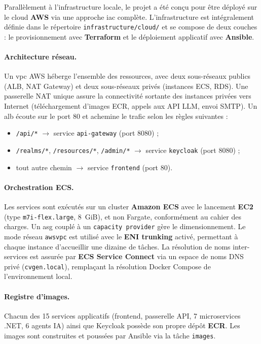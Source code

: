 Parallèlement à l'infrastructure locale, le projet \projectname{} a été conçu pour être déployé sur le cloud \textbf{AWS} via une approche \gls{iac} complète. L'infrastructure est intégralement définie dans le répertoire \texttt{infrastructure/cloud/} et se compose de deux couches : le provisionnement avec \textbf{Terraform} et le déploiement applicatif avec \textbf{Ansible}.

\paragraph{Architecture réseau.} Un \gls{vpc} AWS héberge l'ensemble des ressources, avec deux sous-réseaux publics (ALB, NAT Gateway) et deux sous-réseaux privés (instances ECS, RDS). Une passerelle NAT unique assure la connectivité sortante des instances privées vers Internet (téléchargement d'images ECR, appels aux API LLM, envoi SMTP). Un \gls{alb} écoute sur le port 80 et achemine le trafic selon les règles suivantes :
\begin{itemize}
    \item \texttt{/api/*} $\rightarrow$ service \texttt{api-gateway} (port 8080) ;
    \item \texttt{/realms/*}, \texttt{/resources/*}, \texttt{/admin/*} $\rightarrow$ service \texttt{keycloak} (port 8080) ;
    \item tout autre chemin $\rightarrow$ service \texttt{frontend} (port 80).
\end{itemize}

\paragraph{Orchestration ECS.} Les services sont exécutés sur un cluster \textbf{Amazon ECS} avec le lancement \textbf{EC2} (type \texttt{m7i-flex.large}, 8~GiB), et non Fargate, conformément au cahier des charges. Un \gls{asg} couplé à un \texttt{capacity provider} gère le dimensionnement. Le mode réseau \texttt{awsvpc} est utilisé avec le \textbf{ENI trunking} activé, permettant à chaque instance d'accueillir une dizaine de tâches. La résolution de noms inter-services est assurée par \textbf{ECS Service Connect} via un espace de noms DNS privé (\texttt{cvgen.local}), remplaçant la résolution Docker Compose de l'environnement local.

\paragraph{Registre d'images.} Chacun des 15 services applicatifs (frontend, passerelle API, 7 microservices .NET, 6 agents IA) ainsi que Keycloak possède son propre dépôt \textbf{ECR}. Les images sont construites et poussées par Ansible via la tâche \texttt{images}.

